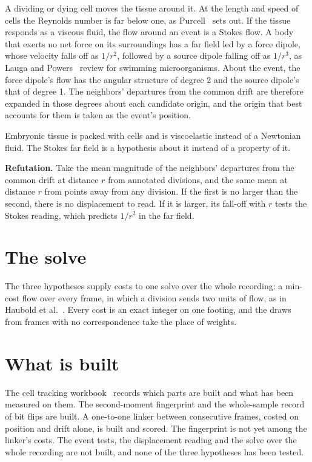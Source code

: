 A dividing or dying cell moves the tissue around it. At the length and speed of cells the Reynolds number is far below one, as Purcell~\cite{src:Purcell-1977} sets out. If the tissue responds as a viscous fluid, the flow around an event is a Stokes flow. A body that exerts no net force on its surroundings has a far field led by a force dipole, whose velocity falls off as \(1/r^2\), followed by a source dipole falling off as \(1/r^3\), as Lauga and Powers~\cite{src:Lauga-Powers-2009} review for swimming microorganisms. About the event, the force dipole's flow has the angular structure of degree 2 and the source dipole's that of degree 1. The neighbors' departures from the common drift are therefore expanded in those degrees about each candidate origin, and the origin that best accounts for them is taken as the event's position.

Embryonic tissue is packed with cells and is viscoelastic instead of a Newtonian fluid. The Stokes far field is a hypothesis about it instead of a property of it.

\textbf{Refutation.} Take the mean magnitude of the neighbors' departures from the common drift at distance \(r\) from annotated divisions, and the same mean at distance \(r\) from points away from any division. If the first is no larger than the second, there is no displacement to read. If it is larger, its fall-off with \(r\) tests the Stokes reading, which predicts \(1/r^2\) in the far field.

\section{\texorpdfstring{The solve}{The solve}}

The three hypotheses supply costs to one solve over the whole recording: a min-cost flow over every frame, in which a division sends two units of flow, as in Haubold et al.~\cite{src:Haubold-2016}. Every cost is an exact integer on one footing, and the draws from frames with no correspondence take the place of weights.

\section{\texorpdfstring{What is built}{What is built}}

The cell tracking workbook~\cite{src:Quigg-cell-tracking-workbook} records which parts are built and what has been measured on them. The second-moment fingerprint and the whole-sample record of bit flips are built. A one-to-one linker between consecutive frames, costed on position and drift alone, is built and scored. The fingerprint is not yet among the linker's costs. The event tests, the displacement reading and the solve over the whole recording are not built, and none of the three hypotheses has been tested.

